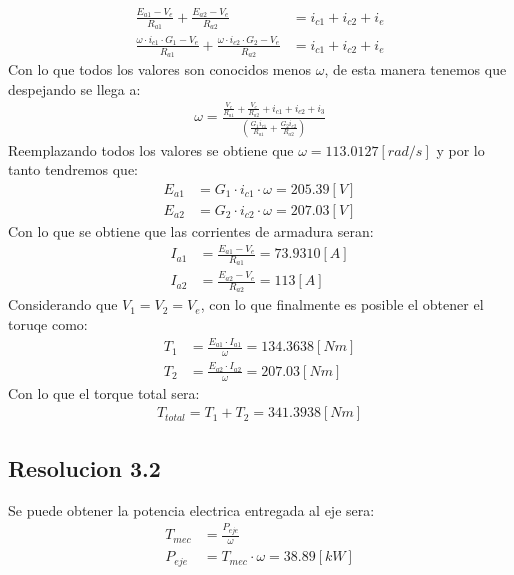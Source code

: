 \documentclass[
  11pt,
  letterpaper,
   addpoints,
   answers
  ]{exam}
\begin{document}
\begin{questions}
\begin{solution}
\begin{align}
        \frac{E_{a1} - V_{e}}{R_{a1}} + \frac{E_{a2} - V_{e}}{R_{a2}} &= i_{c1} + i_{c2} + i_{e}\\
        \frac{\omega \cdot i_{c1} \cdot G_{1} - V_{e}}{R_{a1}} + \frac{\omega \cdot i_{c2} \cdot G_{2} - V_{e}}{R_{a2}} &= i_{c1} + i_{c2} + i_{e}
    \end{align}
    Con lo que todos los valores son conocidos menos $\omega$, de esta manera tenemos que despejando se llega a:
    \begin{align}
        \omega = \frac{\frac{V_{e}}{R_{a1}} + \frac{V_{e}}{R_{a2}} +i_{c1} + i_{c2} +i_{3} }{ \left( \frac{G_{1} i_{c1}}{R_{a1}} + \frac{G_{2}i_{c2}}{R_{a2}}\right)}
    \end{align}
    Reemplazando todos los valores se obtiene que $\omega = 113.0127 [rad/s]$ y por lo tanto tendremos que:
    \begin{align}
        E_{a1} & = G_{1} \cdot i_{c1} \cdot \omega = 205.39[V]\\
        E_{a2} &= G_{2} \cdot i_{c2} \cdot \omega = 207.03[V]
    \end{align}
    Con lo que se obtiene que las corrientes de armadura seran:
    \begin{align}
        I_{a1} &= \frac{E_{a1} - V_{e}}{R_{a1}} = 73.9310[A]\\
        I_{a2} &= \frac{E_{a2} - V_{e}}{R_{a2}} = 113[A]
    \end{align}
    Considerando que $V_{1} =V_{2} = V_{e}$, con lo que finalmente es posible el obtener el toruqe como:
    \begin{align}
        T_{1} &= \frac{E_{a1} \cdot I_{a1}}{\omega} = 134.3638[Nm]\\
        T_{2} &= \frac{E_{a2} \cdot I_{a2}}{\omega} = 207.03[Nm] 
    \end{align}
    Con lo que el torque total sera:
    \begin{align}
        T_{total} = T_{1} + T_{2} = 341.3938[Nm]
    \end{align}
    \subsection*{Resolucion 3.2}
    Se puede obtener la potencia electrica entregada al eje sera:
    \begin{align}
        T_{mec} &= \frac{P_{eje}}{\omega}\\
        P_{eje} &= T_{mec} \cdot \omega = 38.89[kW]
    \end{align}



\end{solution}
\end{questions}
\end{document}
